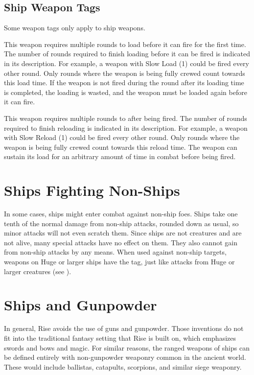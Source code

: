     \subsection{Ship Weapon Tags}
        Some weapon tags only apply to ship weapons.

         This weapon requires multiple rounds to load before it can fire for the first time.
        The number of rounds required to finish loading before it can be fired is indicated in its description.
        For example, a weapon with Slow Load (1) could be fired every other round.
        Only rounds where the weapon is being fully crewed count towards this load time.
        If the weapon is not fired during the round after its loading time is completed, the loading is wasted, and the weapon must be loaded again before it can fire.

         This weapon requires multiple rounds to after being fired.
        The number of rounds required to finish reloading is indicated in its description.
        For example, a weapon with Slow Reload (1) could be fired every other round.
        Only rounds where the weapon is being fully crewed count towards this reload time.
        The weapon can sustain its load for an arbitrary amount of time in combat before being fired.

\section{Ships Fighting Non-Ships}
    In some cases, ships might enter combat against non-ship foes.
    Ships take one tenth of the normal damage from non-ship attacks, rounded down as usual, so minor attacks will not even scratch them.
    Since ships are not creatures and are not alive, many special attacks have no effect on them.
    They also cannot gain  from non-ship attacks by any means.
    When used against non-ship targets, weapons on Huge or larger ships have the  tag, just like attacks from Huge or larger creatures (see ).

\section{Ships and Gunpowder}
    In general, Rise avoids the use of guns and gunpowder.
    Those inventions do not fit into the traditional fantasy setting that Rise is built on, which emphasizes swords and bows and magic.
    For similar reasons, the ranged weapons of ships can be defined entirely with non-gunpowder weaponry common in the ancient world.
    These would include ballistas, catapults, scorpions, and similar siege weaponry.

